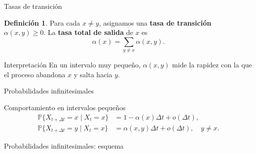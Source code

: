 \documentclass[aspectratio=169]{beamer}
\theoremstyle{plain}
\theoremstyle{definition}
\newtheorem{definicion}{Definición}
\newcommand{\Prob}{\mathbb{P}}
\newcommand{\1}{\mathbf{1}}
\begin{document}
\begin{frame}{Tasas de transición}
  \begin{definicion}
    Para cada $x \neq y$, asignamos una \textbf{tasa de transición} $\alpha(x,y) \geq 0$. La \textbf{tasa total de salida} de $x$ es
    \[ \alpha(x) = \sum_{y \neq x} \alpha(x,y). \]
  \end{definicion}

  \vspace{0.4cm}
  \begin{block}{Interpretación}
    En un intervalo muy pequeño, $\alpha(x,y)$ mide la rapidez con la que el proceso abandona $x$ y salta hacia $y$.
  \end{block}
\end{frame}

\begin{frame}{Probabilidades infinitesimales}
  \begin{block}{Comportamiento en intervalos pequeños}
    \begin{align*}
      \Prob\{X_{t+\Delta t} = x \mid X_t = x\} &= 1 - \alpha(x)\Delta t + o(\Delta t),\\
      \Prob\{X_{t+\Delta t} = y \mid X_t = x\} &= \alpha(x,y)\Delta t + o(\Delta t), \quad y \neq x.
    \end{align*}
  \end{block}
\end{frame}

\begin{frame}{Probabilidades infinitesimales: esquema}
  \begin{center}
  \end{center}
\end{frame}
\end{document}
